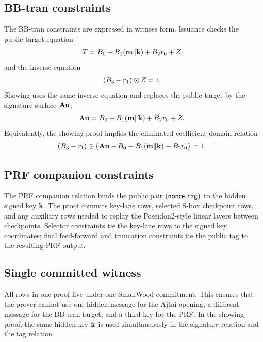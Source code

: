 \subsection{BB-tran constraints}
The BB-tran constraints are expressed in witness form.  Issuance checks the public target equation
\[
  T=B_0+B_1(\mathbf{m}\Vert\mathbf{k})+B_2r_0+Z
\]
and the inverse equation
\[
  (B_3-r_1)\odot Z=1.
\]
Showing uses the same inverse equation and replaces the public target by the signature surface $\mathbf{A}\mathbf{u}$:
\[
  \mathbf{A}\mathbf{u}=B_0+B_1(\mathbf{m}\Vert\mathbf{k})+B_2r_0+Z.
\]
Equivalently, the showing proof implies the eliminated coefficient-domain relation
\[
  (B_3-r_1)\odot\bigl(\mathbf{A}\mathbf{u}-B_0-B_1(\mathbf{m}\Vert\mathbf{k})-B_2r_0\bigr)=1.
\]

\subsection{PRF companion constraints}
The PRF companion relation binds the public pair $(\mathsf{nonce},\mathsf{tag})$ to the hidden signed key $\mathbf{k}$.  The proof
commits key-lane rows, selected S-box checkpoint rows, and any auxiliary rows needed to replay the Poseidon2-style
linear layers between checkpoints.  Selector constraints tie the key-lane rows to the signed key coordinates; final
feed-forward and truncation constraints tie the public tag to the resulting PRF output.

\subsection{Single committed witness}
All rows in one proof live under one SmallWood commitment.  This ensures that the prover cannot use one hidden
message for the Ajtai opening, a different message for the BB-tran target, and a third key for the PRF.  In the showing
proof, the same hidden key $\mathbf{k}$ is used simultaneously in the signature relation and the tag relation.
